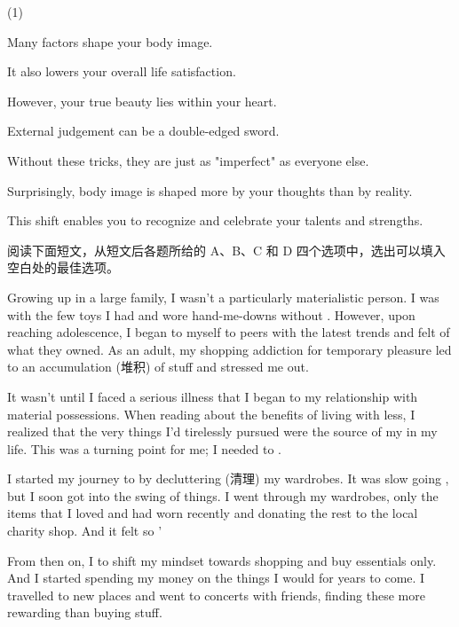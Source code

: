 \documentclass{英语试卷}
\begin{document}
\begin{choices}(1)
  \item Many factors shape your body image.
  \item It also lowers your overall life satisfaction.
  \item However, your true beauty lies within your heart.
  \item External judgement can be a double-edged sword.
  \item Without these tricks, they are just as "imperfect" as everyone else.
  \item Surprisingly, body image is shaped more by your thoughts than by reality.
  \item This shift enables you to recognize and celebrate your talents and strengths.
\end{choices}
\par 阅读下面短文，从短文后各题所给的 A、B、C 和 D 四个选项中，选出可以填入空白处的最佳选项。\par
\par Growing up in a large family, I wasn't a particularly materialistic person. I was  with the few toys I had and wore hand-me-downs without . However, upon reaching adolescence, I began to  myself to peers with the latest trends and felt  of what they owned. As an adult, my shopping addiction for temporary pleasure led to an accumulation (堆积) of  stuff and stressed me out.\par
\par It wasn't until I faced a serious illness that I began to  my relationship with material possessions. When reading about the benefits of living with less, I realized that the very things I'd tirelessly pursued were the source of my  in my life. This was a turning point for me; I needed to .\par
\par I started my journey to  by decluttering (清理) my wardrobes. It was slow going , but I soon got into the swing of things. I went through my wardrobes, only  the items that I loved and had worn recently and donating the rest to the local charity shop. And it felt so '\par
\par From then on, I  to shift my mindset towards shopping and buy essentials only. And I started spending my money on the things I would  for years to come. I travelled to new places and went to concerts with friends, finding these  more rewarding than buying stuff.\par
\end{document}
